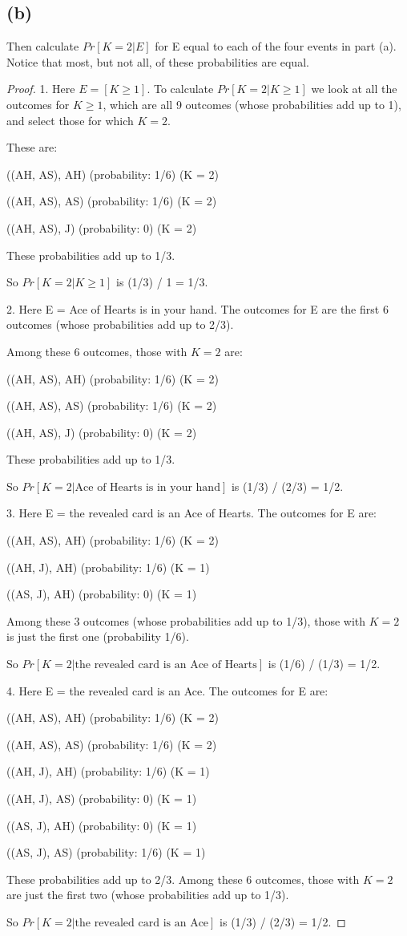 \documentclass[14pt]{extarticle}
\begin{document}
\subsection{(b)}
Then calculate $Pr[K = 2 | E]$ for E equal to each of the four events in part (a). Notice that most, but not all, of these probabilities are equal. 
\begin{proof}
1. Here $E = [K \geq 1]$. To calculate $Pr[K = 2 | K \geq 1]$ we look at all the outcomes for $K \geq 1$, which are all 9 outcomes (whose probabilities add up to 1), and select those for which $K = 2$.

These are:

((AH, AS), AH) (probability: 1/6) (K = 2)

((AH, AS), AS) (probability: 1/6) (K = 2)

((AH, AS), J) (probability: 0) (K = 2)

These probabilities add up to 1/3. 

So $Pr[K = 2 | K \geq 1]$ is (1/3) / 1 = 1/3.

2. Here E = Ace of Hearts is in your hand. The outcomes for E are the first 6 outcomes (whose probabilities add up to 2/3). 

Among these 6 outcomes, those with $K = 2$ are:

((AH, AS), AH) (probability: 1/6) (K = 2)

((AH, AS), AS) (probability: 1/6) (K = 2)

((AH, AS), J) (probability: 0) (K = 2)

These probabilities add up to 1/3. 

So $Pr[K = 2 | \text{Ace of Hearts is in your hand}]$ is (1/3) / (2/3) = 1/2.

3. Here E = the revealed card is an Ace of Hearts. The outcomes for E are:

((AH, AS), AH) (probability: 1/6) (K = 2)

((AH, J), AH) (probability: 1/6) (K = 1)

((AS, J), AH) (probability: 0) (K = 1)

Among these 3 outcomes (whose probabilities add up to 1/3), those with $K = 2$ is just the first one (probability 1/6).

So $Pr[K = 2 | \text{the revealed card is an Ace of Hearts}]$ is (1/6) / (1/3) = 1/2.

4. Here E = the revealed card is an Ace. The outcomes for E are:

((AH, AS), AH) (probability: 1/6) (K = 2)

((AH, AS), AS) (probability: 1/6) (K = 2)

((AH, J), AH) (probability: 1/6) (K = 1)

((AH, J), AS) (probability: 0) (K = 1)

((AS, J), AH) (probability: 0) (K = 1)

((AS, J), AS) (probability: 1/6) (K = 1)

These probabilities add up to 2/3. Among these 6 outcomes, those with $K = 2$ are just the first two (whose probabilities add up to 1/3).

So $Pr[K = 2 | \text{the revealed card is an Ace}]$ is (1/3) / (2/3) = 1/2.
\end{proof}
\end{document}
